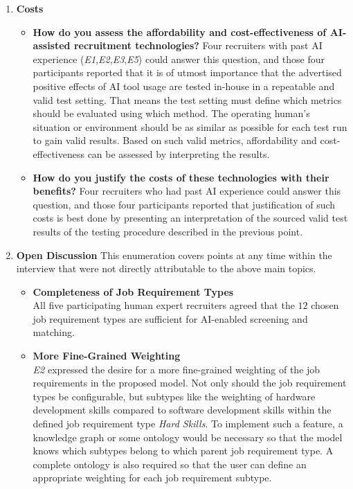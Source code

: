 \documentclass[draft,final]{thesisclass} %
\begin{document}
\begin{enumerate}
\begin{itemize}
    \end{itemize}
    \item \textbf{Costs}
    \begin{itemize}
        \item \textbf{How do you assess the affordability and cost-effectiveness of \acs{AI}-assisted recruitment technologies?}
        Four recruiters with past \acs{AI} experience (\textit{E1},\textit{E2},\textit{E3},\textit{E5}) could answer this question, and those four participants reported that it is of utmost importance that the advertised positive effects of \acs{AI} tool usage are tested in-house in a repeatable and valid test setting. That means the test setting must define which metrics should be evaluated using which method. The operating human's situation or environment should be as similar as possible for each test run to gain valid results. Based on such valid metrics, affordability and cost-effectiveness can be assessed by interpreting the results.
        \item \textbf{How do you justify the costs of these technologies with their benefits?}
        Four recruiters who had past \acs{AI} experience could answer this question, and those four participants reported that justification of such costs is best done by presenting an interpretation of the sourced valid test results of the testing procedure described in the previous point.
    \end{itemize}
    \item \textbf{Open Discussion}
    This enumeration covers points at any time within the interview that were not directly attributable to the above main topics.
    \begin{itemize}
        \item \textbf{Completeness of Job Requirement Types}\\
        All five participating human expert recruiters agreed that the $12$ chosen job requirement types are sufficient for \acs{AI}-enabled screening and matching.
        \item \textbf{More Fine-Grained Weighting}\\
        \textit{E2} expressed the desire for a more fine-grained weighting of the job requirements in the proposed model.
        Not only should the job requirement types be configurable, but subtypes like the weighting of hardware development skills compared to software development skills within the defined job requirement type \textit{Hard Skills}.
        To implement such a feature, a knowledge graph or some ontology would be necessary so that the model knows which subtypes belong to which parent job requirement type. A complete ontology is also required so that the user can define an appropriate weighting for each job requirement subtype.

\end{itemize}
\end{enumerate}
\end{document}

